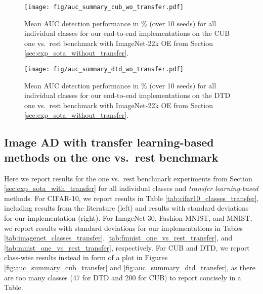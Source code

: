 \documentclass[10pt]{article} \usepackage[accepted]{stylefiles/tmlr}
\begin{document}
\begin{figure}[hbt] 
  \begin{center} 
      \texttt{[image: fig/auc\_summary\_cub\_wo\_transfer.pdf]}
      \caption{Mean AUC detection performance in \% (over 10 seeds) for all individual classes for our end-to-end implementations on the CUB one vs.~rest benchmark with ImageNet-22k OE from Section \ref{sec:exp_sota_without_transfer}.}
      \label{fig:auc_summary_cub_wo_transfer}
  \end{center}
\end{figure}
\begin{figure}[hbt] 
  \begin{center} 
      \texttt{[image: fig/auc\_summary\_dtd\_wo\_transfer.pdf]}
      \caption{Mean AUC detection performance in \% (over 10 seeds) for all individual classes for our end-to-end implementations on the DTD one vs.~rest benchmark with ImageNet-22k OE from Section \ref{sec:exp_sota_without_transfer}.}
      \label{fig:auc_summary_dtd_wo_transfer}
  \end{center}
\end{figure}





\clearpage
\subsection{Image AD with transfer learning-based methods on the one vs.~rest benchmark}
Here we report results for the one vs.~rest benchmark experiments from Section \ref{sec:exp_sota_with_transfer} for all individual classes and \emph{transfer learning-based} methods. 
For CIFAR-10, we report results in Table \ref{tab:cifar10_classes_transfer}, including results from the literature (left) and results with standard deviations for our implementation (right). 
For ImageNet-30, Fashion-MNIST, and MNIST, we report results with standard deviations for our implementations in Tables \ref{tab:imagenet_classes_transfer}, \ref{tab:fmnist_one_vs_rest_transfer}, and \ref{tab:mnist_one_vs_rest_transfer}, respectively. 
For CUB and DTD, we report class-wise results instead in form of a plot in Figures \ref{fig:auc_summary_cub_transfer} and \ref{fig:auc_summary_dtd_transfer}, as there are too many classes (47 for DTD and 200 for CUB) to report concisely in a Table. 
\end{document}
